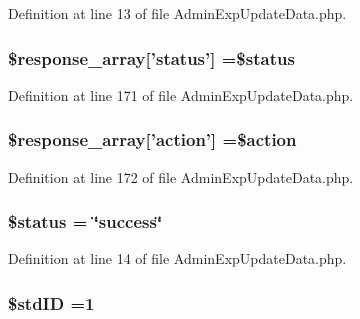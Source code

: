 Definition at line 13 of file Admin\-Exp\-Update\-Data.\-php.

\hypertarget{_admin_exp_update_data_8php_acd0903a7a32e8397aefd0ce8b7dbd1ab}{
\subsubsection[{\$response\-\_\-array}]{\setlength{\rightskip}{0pt plus 5cm}\$response\-\_\-array\mbox{[}'status'\mbox{]} =\$status}}\label{_admin_exp_update_data_8php_acd0903a7a32e8397aefd0ce8b7dbd1ab}


Definition at line 171 of file Admin\-Exp\-Update\-Data.\-php.

\hypertarget{_admin_exp_update_data_8php_ae768978a0cdc416c0d63d798c85c8784}{
\subsubsection[{\$response\-\_\-array}]{\setlength{\rightskip}{0pt plus 5cm}\$response\-\_\-array\mbox{[}'action'\mbox{]} =\$action}}\label{_admin_exp_update_data_8php_ae768978a0cdc416c0d63d798c85c8784}


Definition at line 172 of file Admin\-Exp\-Update\-Data.\-php.

\hypertarget{_admin_exp_update_data_8php_a58391ea75f2d29d5d708d7050b641c33}{
\subsubsection[{\$status}]{\setlength{\rightskip}{0pt plus 5cm}\$status = \char`\"{}success\char`\"{}}}\label{_admin_exp_update_data_8php_a58391ea75f2d29d5d708d7050b641c33}


Definition at line 14 of file Admin\-Exp\-Update\-Data.\-php.

\hypertarget{_admin_exp_update_data_8php_a1d3cd82753ac2a11daa05848b6a2cda8}{
\subsubsection[{\$std\-I\-D}]{\setlength{\rightskip}{0pt plus 5cm}\$std\-I\-D =1}}\label{_admin_exp_update_data_8php_a1d3cd82753ac2a11daa05848b6a2cda8}



